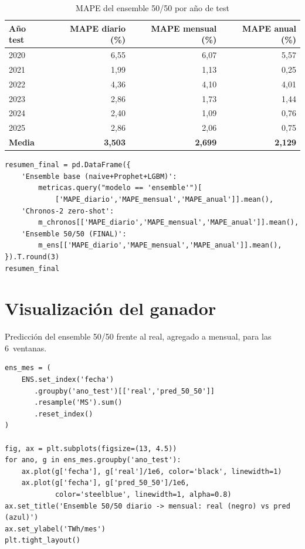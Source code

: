 \documentclass[12pt,a4paper]{article}
\begin{document}
\begin{table}[H]
\centering
\caption{MAPE del ensemble 50/50 por año de test}
\begin{tabular}{lrrr}
\toprule
Año test & MAPE diario (\%) & MAPE mensual (\%) & MAPE anual (\%) \\
\midrule
2020 & 6{,}55 & 6{,}07 & 5{,}57 \\
2021 & 1{,}99 & 1{,}13 & 0{,}25 \\
2022 & 4{,}36 & 4{,}10 & 4{,}01 \\
2023 & 2{,}86 & 1{,}73 & 1{,}44 \\
2024 & 2{,}40 & 1{,}09 & 0{,}76 \\
2025 & 2{,}86 & 2{,}06 & 0{,}75 \\
\midrule
\textbf{Media} & \textbf{3{,}503} & \textbf{2{,}699} & \textbf{2{,}129} \\
\bottomrule
\end{tabular}
\end{table}

\begin{lstlisting}[caption={Resumen comparativo: ensemble base, Chronos-2 y ensemble 50/50}]
resumen_final = pd.DataFrame({
    'Ensemble base (naive+Prophet+LGBM)':
        metricas.query("modelo == 'ensemble'")[
            ['MAPE_diario','MAPE_mensual','MAPE_anual']].mean(),
    'Chronos-2 zero-shot':
        m_chronos[['MAPE_diario','MAPE_mensual','MAPE_anual']].mean(),
    'Ensemble 50/50 (FINAL)':
        m_ens[['MAPE_diario','MAPE_mensual','MAPE_anual']].mean(),
}).T.round(3)
resumen_final
\end{lstlisting}

\section{Visualización del ganador}

Predicción del ensemble 50/50 frente al real, agregado a mensual, para
las 6~ventanas.

\begin{lstlisting}[caption={Serie mensual: real vs.\ ensemble 50/50}]
ens_mes = (
    ENS.set_index('fecha')
       .groupby('ano_test')[['real','pred_50_50']]
       .resample('MS').sum()
       .reset_index()
)

fig, ax = plt.subplots(figsize=(13, 4.5))
for ano, g in ens_mes.groupby('ano_test'):
    ax.plot(g['fecha'], g['real']/1e6, color='black', linewidth=1)
    ax.plot(g['fecha'], g['pred_50_50']/1e6,
            color='steelblue', linewidth=1, alpha=0.8)
ax.set_title('Ensemble 50/50 diario -> mensual: real (negro) vs pred (azul)')
ax.set_ylabel('TWh/mes')
plt.tight_layout()
\end{lstlisting}
\end{document}
